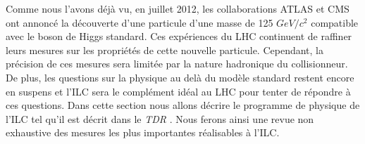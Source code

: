% 
% 
% 
% 

   Comme nous l'avons d\'ej\`a vu, en juillet 2012, les collaborations ATLAS et CMS ont annonc\'e la d\'ecouverte d'une particule d'une masse de 125 $GeV/c^2$ compatible avec le boson de Higgs standard\cite{Aad:2012tfa, Chatrchyan:2012ufa}. Ces exp\'eriences du LHC continuent de raffiner leurs mesures sur les propri\'et\'es de cette nouvelle particule. Cependant, la pr\'ecision de ces mesures sera limit\'ee par la nature hadronique du collisionneur. De plus, les questions sur la physique au del\`a du mod\`ele standard restent encore en suspens et l'ILC sera le compl\'ement id\'eal au LHC pour tenter de r\'epondre \`a ces questions. Dans cette section nous allons d\'ecrire le programme de physique de l'ILC tel qu'il est d\'ecrit dans le \textit{TDR} \cite{Baer:2013cma}. Nous ferons ainsi une revue non exhaustive des mesures les plus importantes r\'ealisables \`a l'ILC.
   
